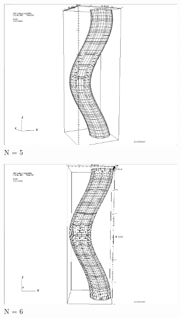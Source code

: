 \documentclass[12pt]{article}
\begin{document}
	\begin{figure}[h]
	\centering
	\begin{subfigure}[h]{0.400\textwidth}
		\centering
		\includegraphics[width=\textwidth]{mesh6.png}
		\caption{N = 5}
	\end{subfigure}
	\begin{subfigure}[h]{0.400\textwidth}
		\centering
		\includegraphics[width=\textwidth]{mesh7.png}
		\caption{N = 6}
	\end{subfigure}
	\begin{subfigure}[h]{0.400\textwidth}
		\centering

\end{subfigure}
\end{figure}
\end{document}
